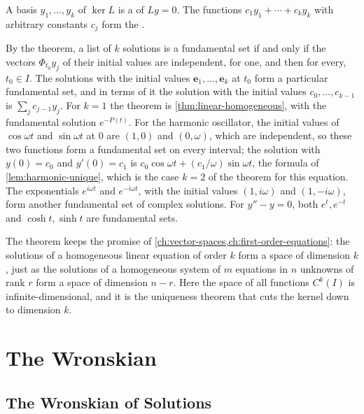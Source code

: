 \begin{definition}
\label{def:fundamental-set}
A basis $y_1,\ldots,y_k$ of $\ker L$ is a  of $Ly=0$. The functions $c_1y_1+\cdots+c_ky_k$ with arbitrary constants $c_j$ form the .
\end{definition}

By the theorem, a list of $k$ solutions is a fundamental set if and only if the vectors $\Phi_{t_0}y_j$ of their initial values are independent, for one, and then for every, $t_0\in I$. The solutions with the initial values $\mathbf e_1,\ldots,\mathbf e_k$ at $t_0$ form a particular fundamental set, and in terms of it the solution with the initial values $c_0,\ldots,c_{k-1}$ is $\sum_jc_{j-1}y_j$. For $k=1$ the theorem is \cref{thm:linear-homogeneous}, with the fundamental solution $e^{-P(t)}$. For the harmonic oscillator, the initial values of $\cos\omega t$ and $\sin\omega t$ at $0$ are $(1,0)$ and $(0,\omega)$, which are independent, so these two functions form a fundamental set on every interval; the solution with $y(0)=c_0$ and $y'(0)=c_1$ is $c_0\cos\omega t+(c_1/\omega)\sin\omega t$, the formula of \cref{lem:harmonic-unique}, which is the case $k=2$ of the theorem for this equation. The exponentials $e^{i\omega t}$ and $e^{-i\omega t}$, with the initial values $(1,i\omega)$ and $(1,-i\omega)$, form another fundamental set of complex solutions. For $y''-y=0$, both $e^t,e^{-t}$ and $\cosh t,\sinh t$ are fundamental sets.

The theorem keeps the promise of \cref{ch:vector-spaces,ch:first-order-equations}: the solutions of a homogeneous linear equation of order $k$ form a space of dimension $k$, just as the solutions of a homogeneous system of $m$ equations in $n$ unknowns of rank $r$ form a space of dimension $n-r$. Here the space of all functions $C^k(I)$ is infinite-dimensional, and it is the uniqueness theorem that cuts the kernel down to dimension $k$.

\section{The Wronskian}
\label{sec:wronskian}

\subsection{The Wronskian of Solutions}


